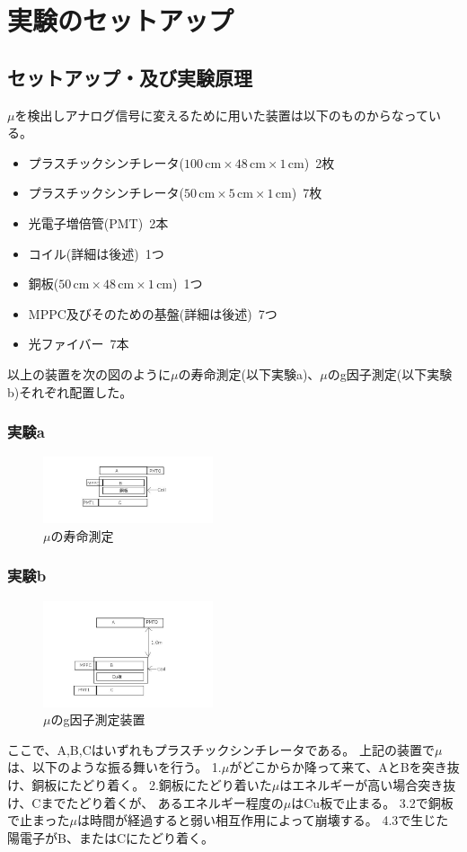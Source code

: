 \section{実験のセットアップ}
\subsection{セットアップ・及び実験原理}
$\mu$を検出しアナログ信号に変えるために用いた装置は以下のものからなっている。
\begin{itemize}
  \item プラスチックシンチレータ($100\,\mathrm{cm} \times 48\,\mathrm{cm} \times 1\,\mathrm{cm}$)\ 2枚
  \item プラスチックシンチレータ($50\,\mathrm{cm} \times 5\,\mathrm{cm} \times 1\,\mathrm{cm}$)\ 7枚
  \item 光電子増倍管(PMT)\ 2本
  \item コイル(詳細は後述)\ 1つ
  \item 銅板($50\,\mathrm{cm}\times 48\,\mathrm{cm} \times 1\,\mathrm{cm}$)\ 1つ
  \item MPPC及びそのための基盤(詳細は後述)\ 7つ
  \item 光ファイバー\ 7本
\end{itemize}
以上の装置を次の図のように$\mu$の寿命測定(以下実験a)、$\mu$のg因子測定(以下実験b)それぞれ配置した。
\subsubsection{実験a}
\begin{figure}[h]
  \includegraphics[width=5cm,bb=0 0 640 250]{zikken_a.jpg}
  \caption{$\mu$の寿命測定}
\end{figure}
\subsubsection{実験b}
\begin{figure}[h]
  \includegraphics[width=5cm,bb=0 0 640 400]{zikken_b.jpg}
  \caption{$\mu$のg因子測定装置}
\end{figure}
ここで、A,B,Cはいずれもプラスチックシンチレータである。
上記の装置で$\mu$は、以下のような振る舞いを行う。
1.$\mu$がどこからか降って来て、AとBを突き抜け、銅板にたどり着く。
2.銅板にたどり着いた$\mu$はエネルギーが高い場合突き抜け、Cまでたどり着くが、
あるエネルギー程度の$\mu$はCu板で止まる。
3.2で銅板で止まった$\mu$は時間が経過すると弱い相互作用によって崩壊する。
4.3で生じた陽電子がB、またはCにたどり着く。

